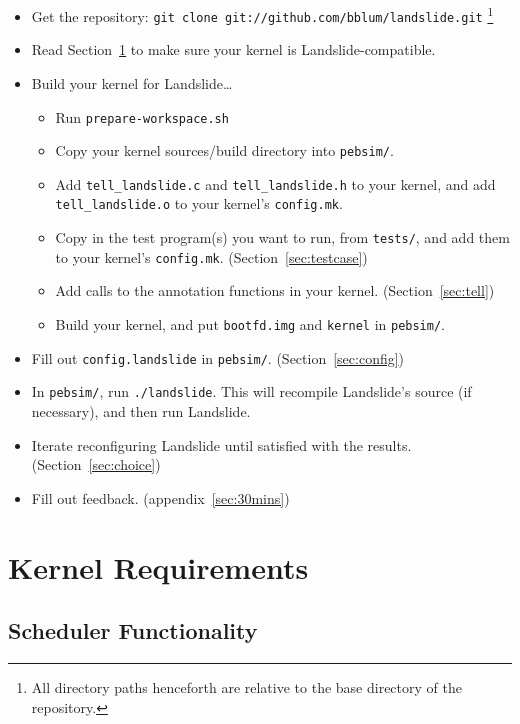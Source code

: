 \documentclass{article}
\begin{document}
\begin{itemize}
	\item Get the repository: \texttt{git clone git://github.com/bblum/landslide.git}
		\footnote{All directory paths henceforth are relative to the base directory of the repository.}
	\item Read Section~\ref{sec:requirements} to make sure your kernel is Landslide-compatible.
	\item Build your kernel for Landslide\dots
	\begin{itemize}
		\item Run \texttt{prepare-workspace.sh}
		\item Copy your kernel sources/build directory into \texttt{pebsim/}.
		\item Add \texttt{tell\_landslide.c} and \texttt{tell\_landslide.h} to your kernel, and add \texttt{tell\_landslide.o} to your kernel's \texttt{config.mk}.
		\item Copy in the test program(s) you want to run, from \texttt{tests/}, and add them to your kernel's \texttt{config.mk}. (Section~\ref{sec:testcase})
		\item Add calls to the annotation functions in your kernel. (Section~\ref{sec:tell})
		\item Build your kernel, and put \texttt{bootfd.img} and \texttt{kernel} in \texttt{pebsim/}.
	\end{itemize}
	\item Fill out \texttt{config.landslide} in \texttt{pebsim/}. (Section~\ref{sec:config})
	\item In \texttt{pebsim/}, run \texttt{./landslide}. This will recompile Landslide's source (if necessary), and then run Landslide.
	\item Iterate reconfiguring Landslide until satisfied with the results. (Section~\ref{sec:choice})
	\item Fill out feedback. (appendix~\ref{sec:30mins})
\end{itemize}

\section{Kernel Requirements}
\label{sec:requirements}

\subsection{Scheduler Functionality}
\label{sec:schedfunc}
\end{document}
